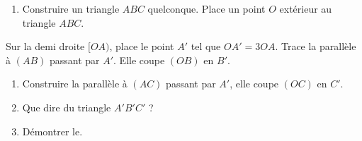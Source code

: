 
\begin{enumerate}
\item Construire un triangle $ABC$ quelconque. Place un point $O$ extérieur au triangle $ABC$.
\end{enumerate}
Sur la demi droite $[OA)$, place le point $A'$ tel que $OA'=3OA$. Trace la parallèle à $(AB)$ passant par $A'$. Elle coupe $(OB)$ en $B'$.
\begin{enumerate} [resume]
\item Construire la parallèle à $(AC)$ passant par $A'$, elle coupe $(OC)$ en $C'$.
\item Que dire du triangle $A'B'C'$ ?
\item Démontrer le.
\end{enumerate}